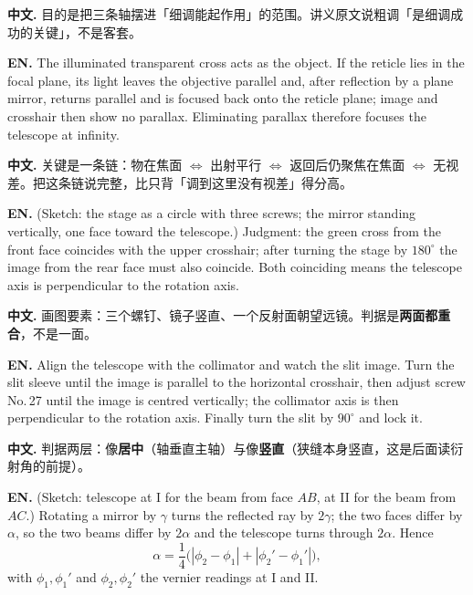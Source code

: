 \textbf{中文.} 目的是把三条轴摆进「细调能起作用」的范围。讲义原文说粗调「是细调成功的关键」，不是客套。


\textbf{EN.} The illuminated transparent cross acts as the object. If the reticle lies in the focal plane, its light leaves the objective parallel and, after reflection by a plane mirror, returns parallel and is focused back onto the reticle plane; image and crosshair then show no parallax. Eliminating parallax therefore focuses the telescope at infinity.

\textbf{中文.} 关键是一条链：物在焦面 $\Leftrightarrow$ 出射平行 $\Leftrightarrow$ 返回后仍聚焦在焦面 $\Leftrightarrow$ 无视差。把这条链说完整，比只背「调到这里没有视差」得分高。


\textbf{EN.} (Sketch: the stage as a circle with three screws; the mirror standing vertically, one face toward the telescope.) Judgment: the green cross from the front face coincides with the upper crosshair; after turning the stage by $180^{\circ}$ the image from the rear face must also coincide. Both coinciding means the telescope axis is perpendicular to the rotation axis.

\textbf{中文.} 画图要素：三个螺钉、镜子竖直、一个反射面朝望远镜。判据是\textbf{两面都重合}，不是一面。


\textbf{EN.} Align the telescope with the collimator and watch the slit image. Turn the slit sleeve until the image is parallel to the horizontal crosshair, then adjust screw No.\,27 until the image is centred vertically; the collimator axis is then perpendicular to the rotation axis. Finally turn the slit by $90^{\circ}$ and lock it.

\textbf{中文.} 判据两层：像\textbf{居中}（轴垂直主轴）与像\textbf{竖直}（狭缝本身竖直，这是后面读衍射角的前提）。


\textbf{EN.} (Sketch: telescope at I for the beam from face $AB$, at II for the beam from $AC$.) Rotating a mirror by $\gamma$ turns the reflected ray by $2\gamma$; the two faces differ by $\alpha$, so the two beams differ by $2\alpha$ and the telescope turns through $2\alpha$. Hence
\[
\alpha=\frac14\bigl(|\phi_2-\phi_1|+|\phi_2'-\phi_1'|\bigr),
\]
with $\phi_1,\phi_1'$ and $\phi_2,\phi_2'$ the vernier readings at I and II.

